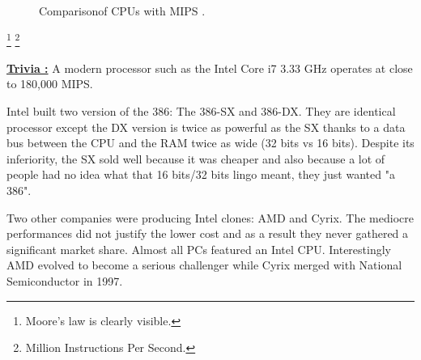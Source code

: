 \documentclass[book.tex]{subfiles}
\begin{document}
\begin{figure}[H]
\centering
   \caption{Comparison\protect\footnotemark  of CPUs with MIPS \protect\footnotemark.}
 \end{figure}
 \footnote{Moore's law is clearly visible.}
 \footnote{Million Instructions Per Second.}
 
 \par
  \textbf{\underline{Trivia :}} A modern processor such as the Intel Core i7 3.33 GHz operates at close to 180,000 MIPS.\\
  \par
 Intel built two version of the 386: The 386-SX and 386-DX. They are identical processor except the DX version is twice as powerful as the SX thanks to a data bus between the CPU and the RAM twice as wide (32 bits vs 16 bits). Despite its inferiority, the SX sold well because it was cheaper and also because a lot of people had no idea what that 16 bits/32 bits lingo meant, they just wanted "a 386".\\
 \par
Two other companies were producing Intel clones: AMD and Cyrix. The mediocre performances did not justify the lower cost and as a result they never gathered a significant market share. Almost all PCs featured an Intel CPU. Interestingly AMD evolved to become a serious challenger while Cyrix merged with National Semiconductor in 1997.\\
\par
\end{document}
